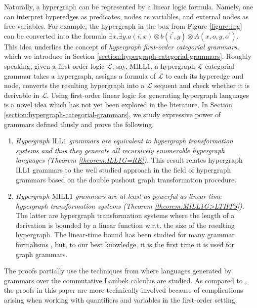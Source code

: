 \documentclass[a4paper,UKenglish,cleveref, autoref, thm-restate,pdfa]{lipics-v2021}
\newcommand{\mconj}{\otimes}
\newcommand{\Logic}{\mathcal{L}}
\newcommand{\ILLFO}{\mathrm{ILL}1}
\newcommand{\MILLFO}{\mathrm{MILL}1}
\begin{document}
Naturally, a hypergraph can be represented by a linear logic formula. Namely, one can interpret hyperedges as predicates, nodes as variables, and external nodes as free variables. For example, the hypergraph in the box from Figure \ref{figure:hrg} can be converted into the formula $\exists x.\exists y. a(i,x)\mconj b(i^\prime,y)\mconj A(x,o,y,o^\prime)$. This idea underlies the concept of \emph{hypergraph first-order categorial grammars}, which we introduce in Section \ref{section:hypergraph-categorial-grammars}. Roughly speaking, given a first-order logic $\Logic$, say, $\MILLFO$, a hypergraph $\Logic$ categorial grammar takes a hypergraph, assigns a formula of $\Logic$ to each its hyperedge and node, converts the resulting hypergraph into a $\Logic$ sequent and check whether it is derivable in $\Logic$. Using first-order linear logic for generating hypergraph languages is a novel idea which has not yet been explored in the literature. In Section \ref{section:hypergraph-categorial-grammars}, we study expressive power of grammars defined thusly and prove the following.
\begin{enumerate}
	\item \textit{Hypergraph $\ILLFO$ grammars are equivalent to hypergraph transformation systems and thus they generate all recursively enumerable hypergraph languages (Theorem \ref{theorem:ILL1G=RE}).} This result relates hypergraph $\ILLFO$ grammars to the well studied approach in the field of hypergraph grammars based on the double pushout graph transformation procedure.
	\item \emph{Hypergraph $\MILLFO$ grammars are at least as powerful as linear-time hypergraph transformation systems (Theorem \ref{theorem:MILL1G>LTHTS}).} The latter are hypergraph transformation systems where the length of a derivation is bounded by a linear function w.r.t. the size of the resulting hypergraph. The linear-time bound has been studied for many grammar formalisms \cite{Book71,Gladkii64,Pshenitsyn23,Tadaki10}, but, to our best knowledge, it is the first time it is used for graph grammars.
\end{enumerate}
The proofs partially use the techniques from \cite{Pshenitsyn23} where languages generated by grammars over the commutative Lambek calculus are studied. As compared to \cite{Pshenitsyn23}, the proofs in this paper are more technically involved because of complications arising when working with quantifiers and variables in the first-order setting.
\end{document}
